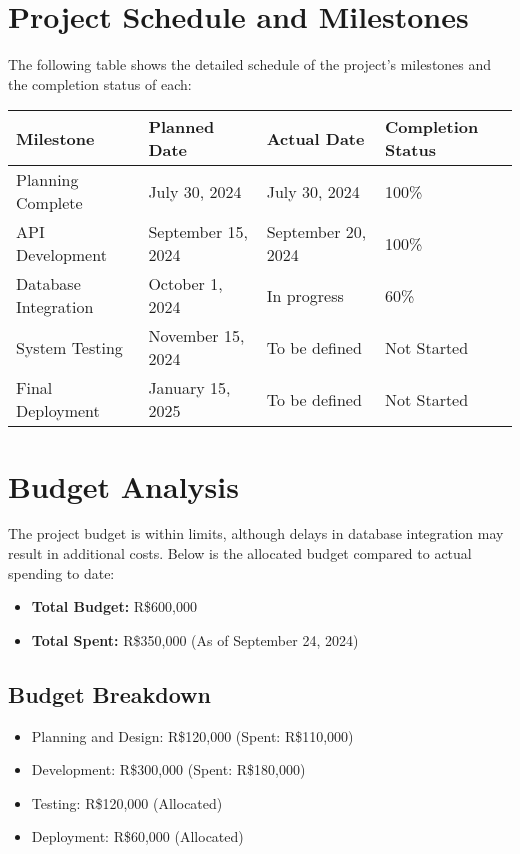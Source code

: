 \documentclass[12pt]{article}
\begin{document}
\section*{Project Schedule and Milestones}
The following table shows the detailed schedule of the project’s milestones and the completion status of each:

\begin{center}
\begin{tabular}{|m{4cm}|m{3cm}|m{3cm}|m{3cm}|}
\hline
\textbf{Milestone} & \textbf{Planned Date} & \textbf{Actual Date} & \textbf{Completion Status} \\
\hline
Planning Complete & July 30, 2024 & July 30, 2024 & 100\% \\
\hline
API Development & September 15, 2024 & September 20, 2024 & 100\% \\
\hline
Database Integration & October 1, 2024 & In progress & 60\% \\
\hline
System Testing & November 15, 2024 & To be defined & Not Started \\
\hline
Final Deployment & January 15, 2025 & To be defined & Not Started \\
\hline
\end{tabular}
\end{center}

\section*{Budget Analysis}
The project budget is within limits, although delays in database integration may result in additional costs. Below is the allocated budget compared to actual spending to date:

\begin{itemize}
    \item \textbf{Total Budget:} R\$600,000
    \item \textbf{Total Spent:} R\$350,000 (As of September 24, 2024)
\end{itemize}

\subsection*{Budget Breakdown}
\begin{itemize}
    \item Planning and Design: R\$120,000 (Spent: R\$110,000)
    \item Development: R\$300,000 (Spent: R\$180,000)
    \item Testing: R\$120,000 (Allocated)
    \item Deployment: R\$60,000 (Allocated)
\end{itemize}
\end{document}

